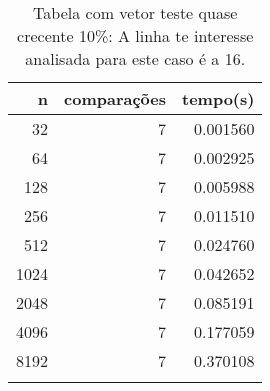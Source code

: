\begin{table}[ht]
\centering
\begin{tabular}{rrr} \toprule
        n &    comparações &       tempo(s) \\ \midrule
      32  &              7 &      0.001560 \\
      64  &              7 &      0.002925 \\
     128  &              7 &      0.005988 \\
     256  &              7 &      0.011510 \\
     512  &              7 &      0.024760 \\
    1024  &              7 &      0.042652 \\
    2048  &              7 &      0.085191 \\
    4096  &              7 &      0.177059 \\
    8192  &              7 &      0.370108 \\
\bottomrule\addlinespace
\end{tabular}
\caption{Tabela com vetor teste quase crecente 10\%: A linha te interesse analisada para este caso é a 16.}
\label{tab:radixsortQuaseCresc10}
\end{table}
